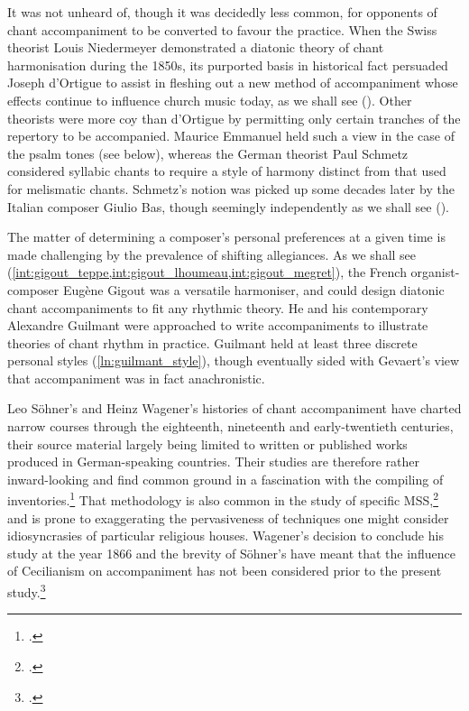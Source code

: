 It was not unheard of, though it was decidedly less common, for opponents of chant accompaniment to be converted to favour the practice.
When the Swiss theorist Louis Niedermeyer demonstrated a diatonic theory of chant harmonisation during the 1850s, its purported basis in historical fact persuaded Joseph d'Ortigue to assist in fleshing out a new method of accompaniment whose effects continue to influence church music today, as we shall see ().
Other theorists were more coy than d'Ortigue by permitting only certain tranches of the repertory to be accompanied.
Maurice Emmanuel held such a view in the case of the psalm tones (see  below), whereas the German theorist Paul Schmetz considered syllabic chants to require a style of harmony distinct from that used for melismatic chants.
Schmetz's notion was picked up some decades later by the Italian composer Giulio Bas, though seemingly independently as we shall see ().

The matter of determining a composer's personal preferences at a given time is made challenging by the prevalence of shifting allegiances.
As we shall see (\cref{int:gigout_teppe,int:gigout_lhoumeau,int:gigout_megret}), the French organist-composer Eugène Gigout was a versatile harmoniser, and could design diatonic chant accompaniments to fit any rhythmic theory.
He and his contemporary Alexandre Guilmant were approached to write accompaniments to illustrate theories of chant rhythm in practice.
Guilmant held at least three discrete personal styles (\cref{ln:guilmant_style}), though eventually sided with Gevaert's view that accompaniment was in fact anachronistic.

Leo Söhner's and Heinz Wagener's histories of chant accompaniment have charted narrow courses through the eighteenth, nineteenth and early-twentieth centuries, their source material largely being limited to written or published works produced in German-speaking countries.
Their studies are therefore rather inward-looking and find common ground in a fascination with the compiling of inventories.\footcites{SoehnerGeschichteBegleitunggregorianischen1931}{WagenerBegleitunggregorianischenChorals1964}
That methodology is also common in the study of specific MSS,\footcites[56--7]{FellererCodXXVII841926}[96--98]{PrasslAnmerkungenzurOrgelbegleitung2012} and is prone to exaggerating the pervasiveness of techniques one might consider idiosyncrasies of particular religious houses.
Wagener's decision to conclude his study at the year 1866 and the brevity of Söhner's have meant that the influence of Cecilianism on accompaniment has not been considered prior to the present study.\footcite{SoehnerOrgelbegleitunggregorianischenGesang1936}

